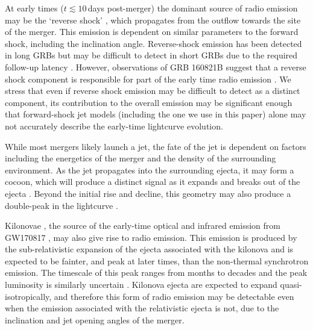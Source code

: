 At early times ($t\lesssim 10$\,days post-merger) the dominant source of radio emission may be the `reverse shock' \citep{1995ApJ...455L.143S,2016ApJ...825...48R,2019MNRAS.489.1820L}, which propagates from the outflow towards the site of the merger. This emission is dependent on similar parameters to the forward shock, including the inclination angle. Reverse-shock emission has been detected in long GRBs \citep[e.g.][]{1999ApJ...522L..97K,2000ApJ...545..807K,2000ApJ...542..819K,2013ApJ...776..119L,2014ApJ...781...37P,2017ApJ...848...69A,2019ApJ...884..121L,2020MNRAS.tmp.1856R} but may be difficult to detect in short GRBs due to the required follow-up latency \citep{2018Galax...6..103L}. However, observations of GRB 160821B suggest that a reverse shock component is responsible for part of the early time radio emission \citep{2019MNRAS.489.2104T,2019ApJ...883...48L}. We stress that even if reverse shock emission may be difficult to detect as a distinct component, its contribution to the overall emission may be significant enough that forward-shock jet models (including the one we use in this paper) alone may not accurately describe the early-time lightcurve evolution.

While most mergers likely launch a jet, the fate of the jet is dependent on factors including the energetics of the merger and the density of the surrounding environment. As the jet propagates into the surrounding ejecta, it may form a cocoon, which will produce a distinct signal as it expands and breaks out of the ejecta \citep{2014ApJ...784L..28N,2014ApJ...788L...8M,2017MNRAS.471.1652L,2017ApJ...834...28N,2018MNRAS.473..576G}. Beyond the initial rise and decline, this geometry may also produce a double-peak in the lightcurve \citep{2018arXiv180508338B}.

Kilonovae \citep[e.g.,][]{2010MNRAS.406.2650M,2012ApJ...746...48M,2015MNRAS.450.1777K,2015MNRAS.446.1115M,2016ApJ...829..110B}, the source of the early-time optical and infrared emission from GW170817 \citep{2017Natur.551...67P,2017Natur.551...80K,2017Natur.551...75S}, may also give rise to radio emission. This emission is produced by the sub-relativistic expansion of the ejecta associated with the kilonova and is expected to be fainter, and peak at later times, than the non-thermal synchrotron emission. The timescale of this peak ranges from months to decades and the peak luminosity is similarly uncertain \citep[e.g.,][]{2011Natur.478...82N,2013MNRAS.430.2121P,2018ApJ...867...95H,2019MNRAS.487.3914K,2020MNRAS.495.4981M}. Kilonova ejecta are expected to expand quasi-isotropically, and therefore this form of radio emission may be detectable even when the emission associated with the relativistic ejecta is not, due to the inclination and jet opening angles of the merger.

